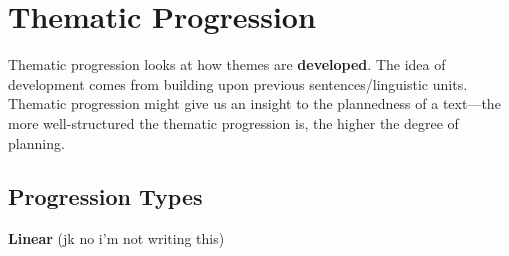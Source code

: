\documentclass[../main.tex]{subfiles}
\begin{document}
    \section{Thematic Progression}
    Thematic progression looks at how themes are \textbf{developed}. The idea of development comes from building upon previous sentences/linguistic units. Thematic progression might give us an insight to the plannedness of a text---the more well-structured the thematic progression is, the higher the degree of planning.

        \subsection{Progression Types}
        \textbf{Linear}
		(jk no i'm not writing this)
\end{document}
